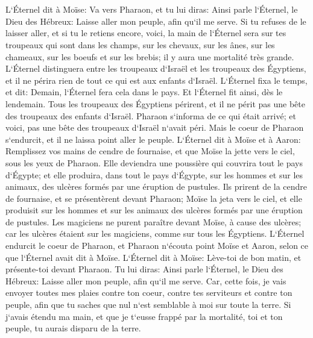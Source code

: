 \chapter{}

\verse L`Éternel dit à Moïse: Va vers Pharaon, et tu lui diras: Ainsi parle l`Éternel, le Dieu des Hébreux: Laisse aller mon peuple, afin qu`il me serve. 
\verse Si tu refuses de le laisser aller, et si tu le retiens encore, 
\verse voici, la main de l`Éternel sera sur tes troupeaux qui sont dans les champs, sur les chevaux, sur les ânes, sur les chameaux, sur les boeufs et sur les brebis; il y aura une mortalité très grande. 
\verse L`Éternel distinguera entre les troupeaux d`Israël et les troupeaux des Égyptiens, et il ne périra rien de tout ce qui est aux enfants d`Israël. 
\verse L`Éternel fixa le temps, et dit: Demain, l`Éternel fera cela dans le pays. 
\verse Et l`Éternel fit ainsi, dès le lendemain. Tous les troupeaux des Égyptiens périrent, et il ne périt pas une bête des troupeaux des enfants d`Israël. 
\verse Pharaon s`informa de ce qui était arrivé; et voici, pas une bête des troupeaux d`Israël n`avait péri. Mais le coeur de Pharaon s`endurcit, et il ne laissa point aller le peuple. 
\verse L`Éternel dit à Moïse et à Aaron: Remplissez vos mains de cendre de fournaise, et que Moïse la jette vers le ciel, sous les yeux de Pharaon. 
\verse Elle deviendra une poussière qui couvrira tout le pays d`Égypte; et elle produira, dans tout le pays d`Égypte, sur les hommes et sur les animaux, des ulcères formés par une éruption de pustules. 
\verse Ils prirent de la cendre de fournaise, et se présentèrent devant Pharaon; Moïse la jeta vers le ciel, et elle produisit sur les hommes et sur les animaux des ulcères formés par une éruption de pustules. 
\verse Les magiciens ne purent paraître devant Moïse, à cause des ulcères; car les ulcères étaient sur les magiciens, comme sur tous les Égyptiens. 
\verse L`Éternel endurcit le coeur de Pharaon, et Pharaon n`écouta point Moïse et Aaron, selon ce que l`Éternel avait dit à Moïse. 
\verse L`Éternel dit à Moïse: Lève-toi de bon matin, et présente-toi devant Pharaon. Tu lui diras: Ainsi parle l`Éternel, le Dieu des Hébreux: Laisse aller mon peuple, afin qu`il me serve. 
\verse Car, cette fois, je vais envoyer toutes mes plaies contre ton coeur, contre tes serviteurs et contre ton peuple, afin que tu saches que nul n`est semblable à moi sur toute la terre. 
\verse Si j`avais étendu ma main, et que je t`eusse frappé par la mortalité, toi et ton peuple, tu aurais disparu de la terre. 

